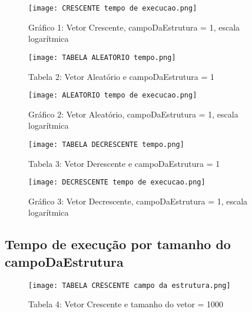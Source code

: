 \documentclass[a4paper, 12pt]{article}
\begin{document}
\begin{figure}[H] %
    \centering
    \texttt{[image: CRESCENTE tempo de execucao.png]}
    \captionsetup{labelformat=empty} %
    \caption{Gráfico 1: Vetor Crescente, campoDaEstrutura = 1, escala logarítmica}
    \label{fig:exemplo}
\end{figure}

\begin{figure}[H] %
    \centering
    \texttt{[image: TABELA ALEATORIO tempo.png]}
    \captionsetup{labelformat=empty} %
    \caption{Tabela 2: Vetor Aleatório e campoDaEstrutura = 1}
    \label{fig:exemplo}
\end{figure}

\begin{figure}[H] %
    \centering
    \texttt{[image: ALEATORIO tempo de execucao.png]}
    \captionsetup{labelformat=empty} %
    \caption{Gráfico 2: Vetor Aleatório, campoDaEstrutura = 1, escala logarítmica}
    \label{fig:exemplo}
\end{figure}

\begin{figure}[H] %
    \centering
    \texttt{[image: TABELA DECRESCENTE tempo.png]}
    \captionsetup{labelformat=empty} %
    \caption{Tabela 3: Vetor Derescente e campoDaEstrutura = 1}
    \label{fig:exemplo}
\end{figure}

\begin{figure}[H] %
    \centering
    \texttt{[image: DECRESCENTE tempo de execucao.png]}
    \captionsetup{labelformat=empty} %
    \caption{Gráfico 3: Vetor Decrescente, campoDaEstrutura = 1, escala logarítmica}
    \label{fig:exemplo}
\end{figure}

\subsection{Tempo de execução por tamanho do campoDaEstrutura}

\begin{figure}[H] %
    \centering
    \texttt{[image: TABELA CRESCENTE campo da estrutura.png]}
    \captionsetup{labelformat=empty} %
    \caption{Tabela 4: Vetor Crescente e tamanho do vetor = 1000}
    \label{fig:exemplo}
\end{figure}
\end{document}
